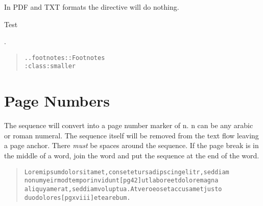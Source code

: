 \documentclass[a5paper]{book}
\begin{document}
\begin{german}
In PDF and TXT formats the {} directive will do
nothing.\footnotemark[1]
\par

Test\footnotemark[2]
\footnotemark[3]

 .\par

\begin{quote}
\begin{alltt}
.. footnotes:: Footnotes
   :class: smaller
\end{alltt}
\end{quote}


%
\label{page-numbers}%
\hypertarget{page-numbers}{}%
%
\section*{Page Numbers}


The sequence {\ttfamily{{[}pg n{]}}} will convert into a page number marker of
n. n can be any arabic or roman numeral. The sequence itself will be
removed from the text flow leaving a page anchor. There {\itshape{must}} be
spaces around the sequence. If the page break is in the middle of a
word, join the word and put the sequence at the end of the word.\par

\begin{quote}
\begin{alltt}
Lorem ipsum dolor sit amet, consetetur sadipscing elitr, sed diam
nonumy eirmod tempor invidunt {[}pg 42{]} ut labore et dolore magna
aliquyam erat, sed diam voluptua. At vero eos et accusam et justo
duo dolores {[}pg xviii{]} et ea rebum.
\end{alltt}
\end{quote}


\end{german}
\end{document}
